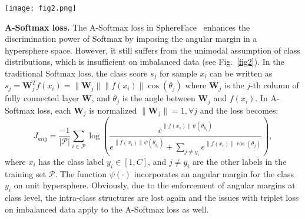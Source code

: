\documentclass[10pt,journal,compsoc]{IEEEtran}
\begin{document}
\begin{figure*}[t]
\begin{center}
\texttt{[image: fig2.png]}
\end{center}
\vspace{-1.5em}
\caption{The 2-D feature space of triplet loss~\cite{Schroff15}, A-Softmax loss~\cite{liu2017sphereface}, Large Margin Local Embedding (LMLE)~\cite{huang2016lmle} and the proposed Cluster-based Large Margin Local Embedding (CLMLE). Class imbalance is exemplified in a binary-class case. The triplet and A-Softmax losses enforce Euclidean and angular margins respectively at class-level, assuming each class can be captured by a single mode. Such unimodal discrimination imposes too strong of a requirement, and may fail to collapse the majority class with larger variation and lead to class overlap. The LMLE enforces Euclidean margins among quintuple examples sampled from the intra- and inter-class local clusters. Such constraint preserves discrimination in local neighborhood and helps form local class boundaries that are insensitive to the imbalanced class size. The proposed CLMLE samples the entire cluster distributions instead to address the inefficiency and inconsistency issues with quintuplet sampling in LMLE. CLMLE also naturally facilitates the derivation of angular margins between cluster distributions on the unit hypersphere.}
\label{fig2}
\end{figure*}

\noindent
{\bf A-Softmax loss.} The A-Softmax loss in SphereFace~\cite{liu2017sphereface} enhances the discrimination power of Softmax by imposing the angular margin in a hypersphere space. However, it still suffers from the unimodal assumption of class distributions, which is insufficient on imbalanced data (see Fig.~\ref{fig2}). In the traditional Softmax loss, the class score $s_j$ for sample $x_i$ can be written as $s_j=\pmb{W}_j^T f(x_i) = \| \pmb{W}_j\|\| f(x_i)\| \cos(\theta_j)$ where $\pmb{W}_j$ is the $j$-th column of fully connected layer $\pmb{W}$, and $\theta_j$ is the angle between $\pmb{W}_j$ and $f(x_i)$. In A-Softmax loss, each $\pmb{W}_j$ is normalized $\|\pmb{W}_j\|=1,\forall j$ and the loss becomes:
\begin{equation}
\label{eq3}
J_{ang} = \frac{-1}{|\mathcal{P}|} \sum_{i\in \mathcal{P}} \log \left( \frac{e^{\| f(x_i)\|\psi(\theta_{y_i})}}{e^{\| f(x_i)\|\psi(\theta_{y_i})}+\sum_{j\ne y_i} e^{\| f(x_i)\|\cos(\theta_j)}}\right),
\end{equation}
where $x_i$ has the class label $y_i \in [1,C]$, and $j\ne y_i$ are the other labels in the training set $\mathcal{P}$. The function $\psi(\cdot)$ incorporates an angular margin for the class $y_i$ on unit hypersphere. Obviously, due to the enforcement of angular margins at class level, the intra-class structures are lost again and the issues with triplet loss on imbalanced data apply to the A-Softmax loss as well.
\end{document}
